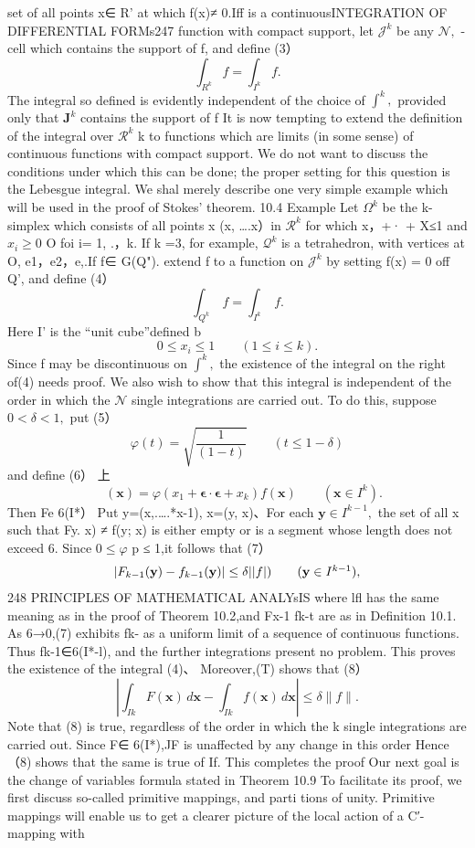 set of all points x∈ R' at which f(x)≠ 0.Iff is a continuousINTEGRATION OF DIFFERENTIAL FORMs247 function with compact support, let $\textstyle{\mathcal{J}}^{k}$ be any ${\mathcal{N}},$ -cell which contains the support of f, and define (3） $$ \int_{R^{k}}f=\int_{I^{k}}f. $$ The integral so defined is evidently independent of the choice of $\textstyle{\int}^{k},$ provided only that ${\boldsymbol{J}}^{k}$ contains the support of f It is now tempting to extend the definition of the integral over $\textstyle{\mathcal{R}}^{k}$ k to functions which are limits (in some sense) of continuous functions with compact support. We do not want to discuss the conditions under which this can be done; the proper setting for this question is the Lebesgue integral. We shal merely describe one very simple example which will be used in the proof of Stokes' theorem. 10.4 Example Let $\Omega^{k}$ be the k-simplex which consists of all points x (x, ….x）in $\textstyle{\mathcal{R}}^{k}$ for which x，+· + X≤1 and $x_{i}\geq0$ O foi i= 1, .，k. If k =3, for example, $\textstyle{\mathcal{Q}}^{k}$ is a tetrahedron, with vertices at O, e1，e2，e,.If f∈ G(Q"). extend f to a function on ${\mathcal{J}}^{k}$ by setting f(x) = 0 off Q', and define (4） $$ \mathit{\int_{Q^{k}}}\ f=\mathit{\int_{I^{k}}}\ f. $$ Here I' is the “unit cube”defined b $$ 0\leq x_{i}\leq1\qquad(1\leq i\leq k). $$ Since f may be discontinuous on $\textstyle{\int}^{k},$ the existence of the integral on the right of(4) needs proof. We also wish to show that this integral is independent of the order in which the ${\mathcal{N}}$ single integrations are carried out. To do this, suppose $0<\delta<1,$ put (5） $$ \varphi(t)\!=\!{\sqrt{\frac{1}{(1-t)}}}\qquad(t\leq1-\delta) $$ and define (6） 上 $$ \quad(\mathbf{x})=\varphi(x_{1}+\mathbf{\epsilon}\cdot\mathbf{\epsilon}+x_{k})f(\mathbf{x})\qquad(\mathbf{x}\in I^{k}). $$ Then Fe 6(I*） Put y=(x,.….*x-1), x=(y, x)、For each $\mathbf{y}\in I^{k-1},$ the set of all x such that Fy. x) ≠ f(y; x) is either empty or is a segment whose length does not exceed 6. Since $0\leq\varphi$ p ≤ 1,it follows that (7） $$ \begin{array}{c l}{{|F_{k-1}({\bf y})-f_{k-1}({\bf y})|\le\delta||f|)}}&{{\ \ \ ({\bf y}\in I^{k-1}),}}\end{array} $$248 PRINCIPLES OF MATHEMATICAL ANALYsIS where lfl has the same meaning as in the proof of Theorem 10.2,and Fx-1 fk-t are as in Definition 10.1. As 6→0,(7) exhibits fk- as a uniform limit of a sequence of continuous functions. Thus fk-1∈6(I*-l), and the further integrations present no problem. This proves the existence of the integral (4)、 Moreover,(T) shows that (8） $$ \left|\int_{I k}F(\mathbf{x})\,d\mathbf{x}-\int_{I k}f(\mathbf{x})\,d\mathbf{x}\right|\leq\delta\|f\|. $$ Note that (8) is true, regardless of the order in which the k single integrations are carried out. Since F∈ 6(I*),JF is unaffected by any change in this order Hence（8) shows that the same is true of If. This completes the proof Our next goal is the change of variables formula stated in Theorem 10.9 To facilitate its proof, we first discuss so-called primitive mappings, and parti tions of unity. Primitive mappings will enable us to get a clearer picture of the local action of a C′-mapping with 